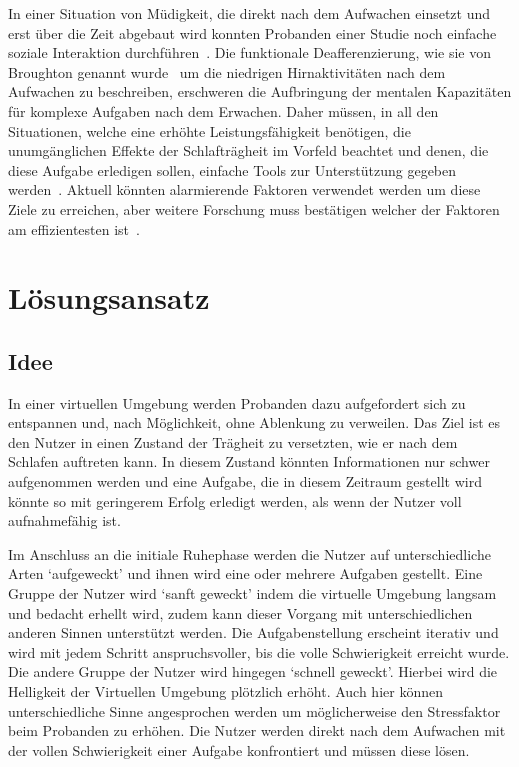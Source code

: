 \documentclass[a4paper, 11pt]{article}
\begin{document}
In einer Situation von Müdigkeit, die direkt nach dem Aufwachen einsetzt und erst über die Zeit abgebaut wird konnten Probanden einer Studie noch einfache soziale Interaktion durchführen~\cite{dinges1990you}. Die funktionale Deafferenzierung, wie sie von Broughton genannt wurde~\cite{broughton1968sleep} um die niedrigen Hirnaktivitäten nach dem Aufwachen zu beschreiben, erschweren die Aufbringung der mentalen Kapazitäten für komplexe Aufgaben nach dem Erwachen. Daher müssen, in all den Situationen, welche eine erhöhte Leistungsfähigkeit benötigen, die unumgänglichen Effekte der Schlafträgheit im Vorfeld beachtet und denen, die diese Aufgabe erledigen sollen, einfache Tools zur Unterstützung gegeben werden~\cite{ferrara2000sleep}. Aktuell könnten alarmierende Faktoren verwendet werden um diese Ziele zu erreichen, aber weitere Forschung muss bestätigen welcher der Faktoren am effizientesten ist~\cite{ferrara2000sleep}.

\section*{Lösungsansatz}
\subsection*{Idee}
In einer virtuellen Umgebung werden Probanden dazu aufgefordert sich zu entspannen und, nach Möglichkeit, ohne Ablenkung zu verweilen. Das Ziel ist es den Nutzer in einen Zustand der Trägheit zu versetzten, wie er nach dem Schlafen auftreten kann. In diesem Zustand könnten Informationen nur schwer aufgenommen werden und eine Aufgabe, die in diesem Zeitraum gestellt wird könnte so mit geringerem Erfolg erledigt werden, als wenn der Nutzer voll aufnahmefähig ist. 

Im Anschluss an die initiale Ruhephase werden die Nutzer auf unterschiedliche Arten `auf\-geweckt' und ihnen wird eine oder mehrere Aufgaben gestellt. Eine Gruppe der Nutzer wird `sanft geweckt' indem die virtuelle Umgebung langsam und bedacht erhellt wird, zudem kann dieser Vorgang mit unterschiedlichen anderen Sinnen unterstützt werden. Die Aufgabenstellung erscheint iterativ und wird mit jedem Schritt anspruchsvoller, bis die volle Schwierigkeit erreicht wurde. 
Die andere Gruppe der Nutzer wird hingegen `schnell geweckt'. Hierbei wird die Helligkeit der Virtuellen Umgebung plötzlich erhöht. Auch hier können unterschiedliche Sinne angesprochen werden um möglicherweise den Stressfaktor beim Probanden zu erhöhen. Die Nutzer werden direkt nach dem Aufwachen mit der vollen Schwierigkeit einer Aufgabe konfrontiert und müssen diese lösen.
\end{document}
